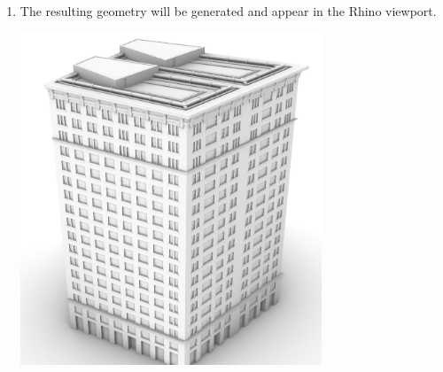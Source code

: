 \begin{enumerate}
\begin{minipage}{\linewidth}
    \end{minipage}
    \newpage
    \item The resulting geometry will be generated and appear in the Rhino viewport.\\
    \begin{minipage}{\linewidth}
        \centering
        \includegraphics[width=9cm]{res/man_rhino_cmd_result}
    \end{minipage}
\end{enumerate}

